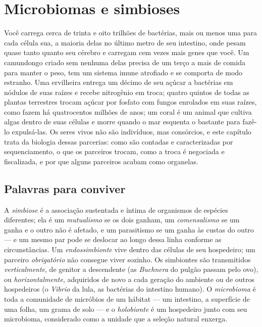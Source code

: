\chapter{Microbiomas e simbioses}\label{ch:b3:microbiomes}

Você carrega cerca de trinta e oito trilhões de bactérias, mais ou
menos uma para cada célula sua, a maioria delas no último metro de seu
intestino, onde pesam quase tanto quanto seu cérebro e carregam cem
vezes mais genes que você. Um camundongo criado sem nenhuma delas
precisa de um terço a mais de comida para manter o peso, tem um sistema
imune atrofiado e se comporta de modo estranho. Uma ervilheira entrega
um décimo de seu açúcar a bactérias em nódulos de suas raízes e recebe
nitrogênio em troca; quatro quintos de todas as plantas terrestres
trocam açúcar por fosfato com fungos enrolados em suas raízes, como
fazem há quatrocentos milhões de anos; um coral é um animal que cultiva
algas dentro de suas células e morre quando o mar esquenta o bastante
para fazê-lo expulsá-las. Os seres vivos não são indivíduos, mas
consórcios, e este capítulo trata da biologia dessas parcerias: como
são contadas e caracterizadas por sequenciamento, o que os parceiros
trocam, como a troca é negociada e fiscalizada, e por que alguns
parceiros acabam como organelas.

\section{Palavras para conviver}

\begin{definition}[Simbiose]\label{def:b3:microbiomes:symbiosis}
A \emph{simbiose} é a associação sustentada e íntima de organismos de
espécies diferentes; ela é um \emph{mutualismo} se os dois ganham, um
\emph{comensalismo} se um ganha e o outro não é afetado, e um
parasitismo se um ganha às custas do outro --- e um mesmo par pode se
deslocar ao longo dessa linha conforme as circunstâncias. Um
\emph{endossimbionte} vive dentro das células de seu hospedeiro; um
parceiro \emph{obrigatório} não consegue viver sozinho. Os simbiontes
são transmitidos \emph{verticalmente}, de genitor a descendente (as
\emph{Buchnera} do pulgão passam pelo ovo), ou
\emph{horizontalmente}, adquiridos de novo a cada geração do ambiente
ou de outros hospedeiros (o \emph{Vibrio} da lula, as bactérias do
intestino humano). O \emph{microbioma} é toda a comunidade de micróbios
de um hábitat --- um intestino, a superfície de uma folha, um grama de
solo --- e o \emph{holobionte} é um hospedeiro junto com seu
microbioma, considerado como a unidade que a seleção natural enxerga.
\end{definition}

